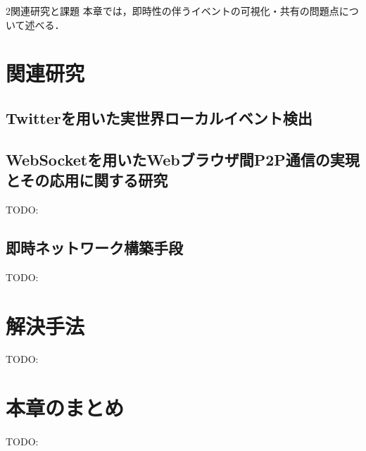 \chapterhead
{2}{関連研究と課題}
{本章では，即時性の伴うイベントの可視化・共有の問題点について述べる．}

\section{関連研究}
\subsection{Twitterを用いた実世界ローカルイベント検出}
\subsection{WebSocketを用いたWebブラウザ間P2P通信の実現とその応用に関する研究}
TODO:

\subsection{即時ネットワーク構築手段}
TODO:


\newpage

\section{解決手法}
TODO:

\section{本章のまとめ}
TODO:
